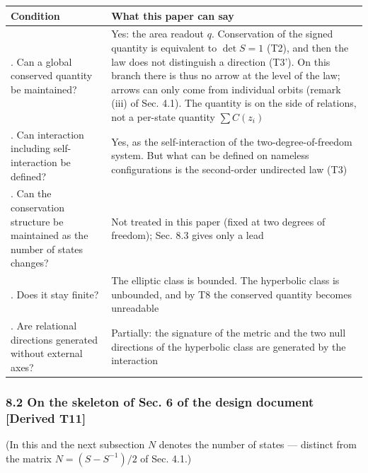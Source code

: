 \documentclass[
  a4paper,
]{article}
\newcounter{none} %
\begin{document}
{\def\LTcaptype{none} %
\begin{longtable}[]{@{}
  >{\raggedright\arraybackslash}p{}
  >{\raggedright\arraybackslash}p{}@{}}
\toprule\noalign{}
\begin{minipage}[b]{\linewidth}\raggedright
Condition
\end{minipage} & \begin{minipage}[b]{\linewidth}\raggedright
What this paper can say
\end{minipage} \\
\midrule\noalign{}
\endhead
\bottomrule\noalign{}
\endlastfoot
1. Can a global conserved quantity be maintained? & Yes: the area
readout \(q\). Conservation of the signed quantity is equivalent to
\(\det S=1\) (T2), and then the law does not distinguish a direction
(T3'). On this branch there is thus no arrow at the level of the law;
arrows can only come from individual orbits (remark (iii) of Sec. 4.1).
The quantity is on the side of relations, not a per-state quantity
\(\sum C(z_i)\) \\
2. Can interaction including self-interaction be defined? & Yes, as the
self-interaction of the two-degree-of-freedom system. But what can be
defined on nameless configurations is the second-order undirected law
(T3) \\
3. Can the conservation structure be maintained as the number of states
changes? & Not treated in this paper (fixed at two degrees of freedom);
Sec. 8.3 gives only a lead \\
4. Does it stay finite? & The elliptic class is bounded. The hyperbolic
class is unbounded, and by T8 the conserved quantity becomes
unreadable \\
5. Are relational directions generated without external axes? &
Partially: the signature of the metric and the two null directions of
the hyperbolic class are generated by the interaction \\
\end{longtable}
}

\subsubsection{8.2 On the skeleton of Sec. 6 of the design document
{[}Derived
T11{]}}\label{on-the-skeleton-of-sec.-6-of-the-design-document-derived-t11}

(In this and the next subsection \(N\) denotes the number of states ---
distinct from the matrix \(N=(S-S^{-1})/2\) of Sec. 4.1.)
\end{document}
